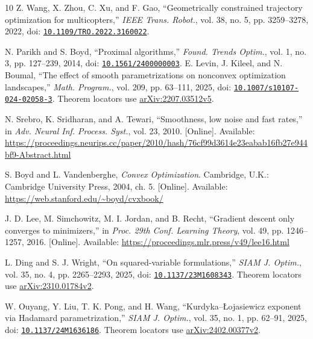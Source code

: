 \begin{thebibliography}{10}
 Z. Wang, X. Zhou, C. Xu, and F. Gao, ``Geometrically constrained trajectory optimization for multicopters,'' \emph{IEEE Trans. Robot.}, vol. 38, no. 5, pp. 3259--3278, 2022, doi: \href{https://doi.org/10.1109/TRO.2022.3160022}{\nolinkurl{10.1109/TRO.2022.3160022}}.

 N. Parikh and S. Boyd, ``Proximal algorithms,'' \emph{Found. Trends Optim.}, vol. 1, no. 3, pp. 127--239, 2014, doi: \href{https://doi.org/10.1561/2400000003}{\nolinkurl{10.1561/2400000003}}.
 E. Levin, J. Kileel, and N. Boumal, ``The effect of smooth parametrizations on nonconvex optimization landscapes,'' \emph{Math. Program.}, vol. 209, pp. 63--111, 2025, doi: \href{https://doi.org/10.1007/s10107-024-02058-3}{\nolinkurl{10.1007/s10107-024-02058-3}}. Theorem locators use \href{https://arxiv.org/abs/2207.03512v5}{arXiv:2207.03512v5}.

 N. Srebro, K. Sridharan, and A. Tewari, ``Smoothness, low noise and fast rates,'' in \emph{Adv. Neural Inf. Process. Syst.}, vol. 23, 2010. [Online]. Available: \url{https://proceedings.neurips.cc/paper/2010/hash/76cf99d3614e23eabab16fb27e944bf9-Abstract.html}

 S. Boyd and L. Vandenberghe, \emph{Convex Optimization}. Cambridge, U.K.: Cambridge University Press, 2004, ch. 5. [Online]. Available: \url{https://web.stanford.edu/~boyd/cvxbook/}

 J. D. Lee, M. Simchowitz, M. I. Jordan, and B. Recht, ``Gradient descent only converges to minimizers,'' in \emph{Proc. 29th Conf. Learning Theory}, vol. 49, pp. 1246--1257, 2016. [Online]. Available: \url{https://proceedings.mlr.press/v49/lee16.html}

 L. Ding and S. J. Wright, ``On squared-variable formulations,'' \emph{SIAM J. Optim.}, vol. 35, no. 4, pp. 2265--2293, 2025, doi: \href{https://doi.org/10.1137/23M1608343}{\nolinkurl{10.1137/23M1608343}}. Theorem locators use \href{https://arxiv.org/abs/2310.01784v2}{arXiv:2310.01784v2}.

 W. Ouyang, Y. Liu, T. K. Pong, and H. Wang, ``Kurdyka--\L{}ojasiewicz exponent via Hadamard parametrization,'' \emph{SIAM J. Optim.}, vol. 35, no. 1, pp. 62--91, 2025, doi: \href{https://doi.org/10.1137/24M1636186}{\nolinkurl{10.1137/24M1636186}}. Theorem locators use \href{https://arxiv.org/abs/2402.00377v2}{arXiv:2402.00377v2}.


\end{thebibliography}
